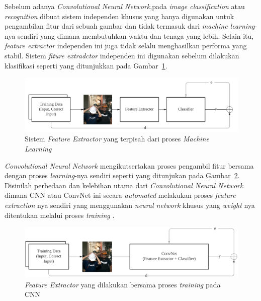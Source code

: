 \par Sebelum adanya \emph{Convolutional Neural Network},pada \emph{image classification} atau \emph{recognition} dibuat sistem independen khusus yang hanya digunakan
untuk pengambilan fitur dari sebuah gambar dan tidak termasuk dari \emph{machine learning}-nya sendiri yang dimana membutuhkan waktu dan tenaga yang lebih. Selain itu, \emph{feature extractor}
independen ini juga tidak selalu menghasilkan performa yang stabil. Sistem \emph{fiture extradctor} independen ini digunakan sebelum dilakukan klasifikasi seperti yang ditunjukkan pada Gambar~\ref{fig:imgecog_beforeconv}.


\begin{figure}[ht]
    \centering
    \includegraphics[width=1.0\textwidth]{gambar/imgrecog_beforconv.png}
    \caption{Sistem \emph{Feature Extractor} yang terpisah dari proses \emph{Machine Learning}}
    \label{fig:imgecog_beforeconv}  
\end{figure}

\par \emph{Convolutional Neural Network} mengikutsertakan proses pengambil fitur bersama dengan 
proses \emph{learning}-nya sendiri seperti yang ditunjukan pada Gambar~\ref{fig:imgrecog_afterconv}. Disinilah perbedaan dan kelebihan utama dari \emph{Convolutional Neural Network}
dimana CNN atau ConvNet ini secara \emph{automated} melakukan proses \emph{feature extraction} nya sendiri yang
menggunakan \emph{neural network} khusus yang \emph{weight} nya ditentukan melalui proses \emph{training} \cite{kim2018safety}.

\begin{figure}[ht]
    \centering
    \includegraphics[width=1.0\textwidth]{gambar/imgrecog_afterconv.png}
    \caption{\emph{Feature Extractor} yang dilakukan bersama proses \emph{training} pada CNN}
    \label{fig:imgrecog_afterconv}  
\end{figure}



